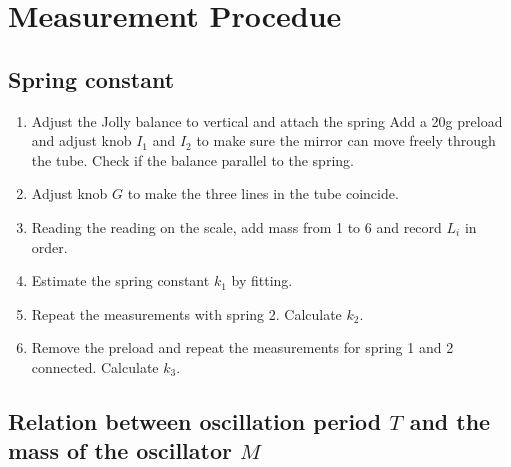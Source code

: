\section{Measurement Procedue}


\subsection{Spring constant}

\begin{enumerate}
\item Adjust the Jolly balance to vertical and attach the spring Add a 20g
  preload and adjust knob $I_1$ and $I_2$ to make sure the mirror can move
  freely through the tube. Check if the balance parallel to the spring. 
\item Adjust knob $G$ to make the three lines in the tube coincide.
\item Reading the reading on the scale, add mass from 1 to 6 and record $L_i$ in
  order. 
\item Estimate the spring constant $k_1$ by fitting.
\item Repeat the measurements with spring 2. Calculate $k_2$.
\item Remove the preload and repeat the measurements for spring 1 and 2
  connected. Calculate $k_3$. 
\end{enumerate}

\subsection{Relation between oscillation period $T$ and the mass of the
  oscillator $M$} 

